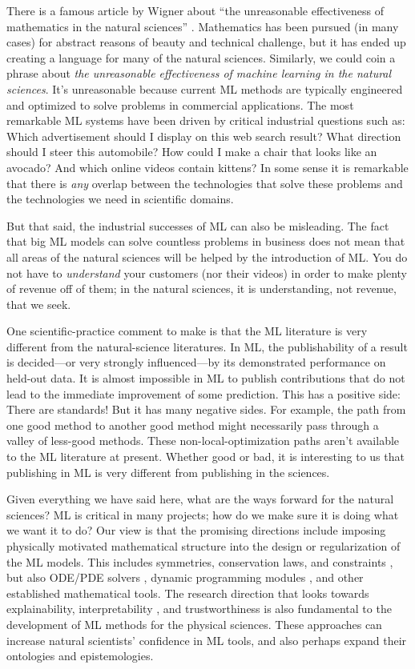 \documentclass{article}
\begin{document}
There is a famous article by Wigner about ``the unreasonable effectiveness of mathematics in the natural sciences'' \cite{wigner}.
Mathematics has been pursued (in many cases) for abstract reasons of beauty and technical challenge, but it has ended up creating a language for many of the natural sciences.
Similarly, we could coin a phrase about \emph{the unreasonable effectiveness of machine learning in the natural sciences}.
It's unreasonable because current ML methods are typically engineered and optimized to solve problems in commercial applications.
The most remarkable ML systems have been driven by critical industrial questions such as:
Which advertisement should I display on this web search result?
What direction should I steer this automobile?
How could I make a chair that looks like an avocado?
And which online videos contain kittens?
In some sense it is remarkable that there is \emph{any} overlap between the technologies that solve these problems and the technologies we need in scientific domains.

But that said, the industrial successes of ML can also be misleading.
The fact that big ML models can solve countless problems in business does not mean that all areas of the natural sciences will be helped by the introduction of ML.
You do not have to \emph{understand} your customers (nor their videos) in order to make plenty of revenue off of them; in the natural sciences, it is understanding, not revenue, that we seek.

One scientific-practice comment to make is that the ML literature is very different from the natural-science literatures.
In ML, the publishability of a result is decided---or very strongly influenced---by its demonstrated performance on held-out data.
It is almost impossible in ML to publish contributions that do not lead to the immediate improvement of some prediction.
This has a positive side: There are standards!
But it has many negative sides.
For example, the path from one good method to another good method might necessarily pass through a valley of less-good methods.
These non-local-optimization paths aren't available to the ML literature at present.
Whether good or bad, it is interesting to us that publishing in ML is very different from publishing in the sciences.

Given everything we have said here, what are the ways forward for the natural sciences?
ML is critical in many projects; how do we make sure it is doing what we want it to do?
Our view is that the promising directions include imposing physically motivated mathematical structure into the design or regularization of the ML models.
This includes symmetries, conservation laws, and constraints \cite{bronstein2021geometric, villar2023towards}, but also ODE/PDE solvers \cite{karniadakis2021physics}, dynamic programming modules \cite{xu2020can}, and other established mathematical tools.
The research direction that looks towards explainability, interpretability \cite{interpretable}, and trustworthiness \cite{kearns2019ethical} is also fundamental to the development of ML methods for the physical sciences.
These approaches can increase natural scientists’ confidence in ML tools, and also perhaps expand their ontologies and epistemologies.
\end{document}
